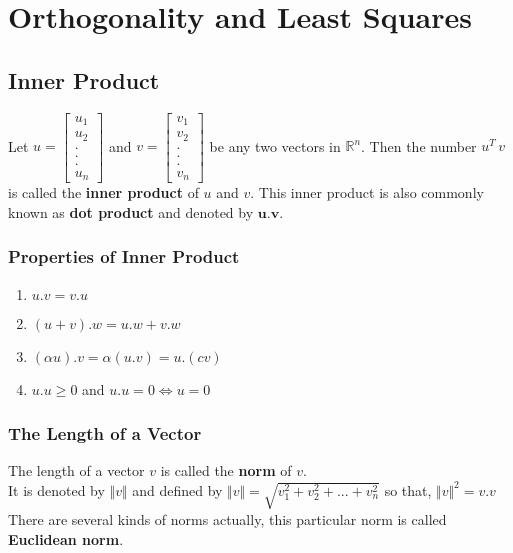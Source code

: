 \documentclass[aima104_lecturenotes_ku.tex]{subfiles}
\begin{document}
\chapter{Orthogonality and Least Squares}
\section{Inner Product}
Let $u =
\begin{bmatrix}
  u_1 \\ u_2 \\ . \\ .\\ .\\ u_n
\end{bmatrix} $ and $v =
\begin{bmatrix}
  v_1 \\ v_2 \\ . \\ .\\ .\\ v_n
\end{bmatrix} $ be any two vectors in $\mathbb{R}^n$. Then the number $u^T\, v$ is called the \textbf{inner product} of $u$ and $v$. This inner product is also commonly known as \textbf{dot product} and denoted by $\mathbf{u.v}$.

\subsection{Properties of Inner Product}
\begin{mdframed}
  \begin{enumerate}
  \item $u.v = v.u$
  \item $(u+v).w = u.w + v.w$
  \item $(\alpha u).v = \alpha (u.v) = u. (cv)$
  \item $u.u \geq 0$ and $u.u = 0 \Longleftrightarrow u=0$
  \end{enumerate}
\end{mdframed}

\subsection{The Length of a Vector}
The length of a vector $v$ is called the \textbf{norm} of $v$. \\ It is denoted by $\Vert v \Vert$ and defined by $\Vert v \Vert = \sqrt{v_1^2 + v_2^2 + ... + v_n^2} $ so that, $\Vert v \Vert ^2 = v.v$ There are several kinds of norms actually, this particular norm is called \textbf{Euclidean norm}.
\end{document}
